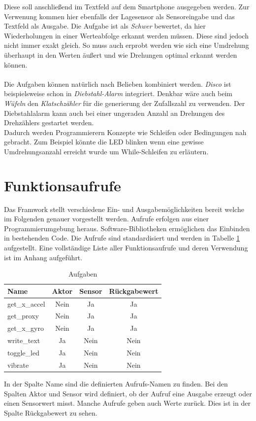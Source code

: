 \documentclass[11pt,a4paper]{report}
\begin{document}
Diese soll anschließend im Textfeld auf dem Smartphone ausgegeben werden.
Zur Verwenung kommen hier ebenfalls der Lagesensor als Sensoreingabe und das Textfeld als Ausgabe.
Die Aufgabe ist als \textit{Schwer} bewertet, da hier Wiederholungen in einer Werteabfolge erkannt werden müssen.
Diese sind jedoch nicht immer exakt gleich.
So muss auch erprobt werden wie sich eine Umdrehung überhaupt in den Werten äußert und wie Drehungen optimal erkannt werden können.
\\\\
Die Aufgaben können natürlich nach Belieben kombiniert werden.
\textit{Disco} ist beispielsweise schon in \textit{Diebstahl-Alarm} integriert.
Denkbar wäre auch beim \textit{Wüfeln} den \textit{Klatschzähler} für die generierung der Zufallszahl zu verwenden.
Der Diebstahlalarm kann auch bei einer ungeraden Anzahl an Drehungen des Drehzählers gestartet werden.
\\
Dadurch werden Programmierern Konzepte wie Schleifen oder Bedingungen nah gebracht.
Zum Beispiel könnte die LED blinken wenn eine gewisse Umdrehungsanzahl erreicht wurde um While-Schleifen zu erläutern.

\section{Funktionsaufrufe}\label{sec:API}
Das Framwork stellt verschiedene Ein- und Ausgabemöglichkeiten bereit welche im Folgenden genauer vorgestellt werden.
Aufrufe erfolgen aus einer Programmierumgebung heraus.
Software-Bibliotheken ermöglichen das Einbinden in bestehenden Code.
Die Aufrufe sind standardisiert und werden in Tabelle \ref{tab:calls} aufgestellt.
Eine vollständige Liste aller Funktionsaufrufe und deren Verwendung ist im Anhang aufgeführt.
\begin{table}[htbp]
  \centering
  \begin{tabular}{|l|c|c|c|}
      \hline
      Name & Aktor & Sensor & Rückgabewert\\
      \hline
	  get\_x\_accel & Nein & Ja & Ja \\
      \hline
		get\_proxy & Nein & Ja & Ja \\
      \hline
		get\_x\_gyro & Nein & Ja & Ja \\
      \hline
      write\_text & Ja & Nein & Nein \\
      \hline
      toggle\_led & Ja & Nein & Nein \\
      \hline  
      vibrate & Ja & Nein & Nein \\
      \hline
      \end{tabular}
  \caption{Aufgaben}
  \label{tab:calls}
\end{table}
In der Spalte Name sind die definierten Aufrufs-Namen zu finden.
Bei den Spalten Aktor und Sensor wird definiert, ob der Aufruf eine Ausgabe erzeugt oder einen Sensorwert misst.
Manche Aufrufe geben auch Werte zurück. Dies ist in der Spalte Rückgabewert zu sehen.
\\\\
\end{document}
